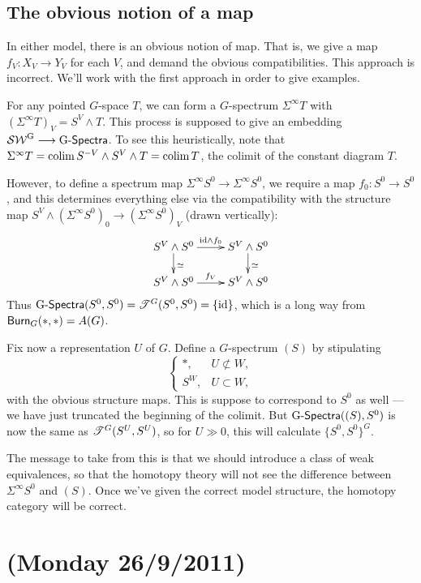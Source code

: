 \documentclass[11pt]{article}
\newcommand{\NewLecture}[3]{\section{#1 {\small(#2/#3/2011)}}}
\begin{document}
\begin{FirstNineLectures}
\subsection*{The obvious notion of a map}
In either model, there is an obvious notion of map. That is, we give a map $f_V:X_V\to Y_V$ for each $V$, and demand the obvious compatibilities. This approach is incorrect. We'll work with the first approach in order to give examples.
\begin{exmp*}
For any pointed $G$-space $T$, we can form a $G$-spectrum $\Sigma^\infty T$ with $(\Sigma^\infty T)_V=S^V\wedge T$. This process is supposed to give an embedding $\operatorname{{\mathcal{SW}^G}}\longrightarrow\operatorname{{G-\mathsf{Spectra}}}$. To see this heuristically, note that $\Sigma^\infty T=\operatorname{colim} S^{-V}\wedge S^V\wedge T=\operatorname{colim} T$, the colimit of the constant diagram $T$. 

However, to define a spectrum map $\Sigma^\infty S^0\to \Sigma^\infty S^0$, we require a map $f_0:S^0\to S^0$, and this determines everything else via the compatibility with the structure map $S^V\wedge(\Sigma^\infty S^0)_0\to(\Sigma^\infty S^0)_V$ (drawn vertically):
\[\xymatrix@R=.6cm{ 
\ar[d]^\simeq S^V\wedge S^0\ar[r]^{\id\wedge f_0}&S^V\wedge S^0\ar[d]^\simeq\\
S^V\wedge S^0\ar[r]^{f_V}&S^V\wedge S^0
}\]
Thus $\operatorname{{G-\mathsf{Spectra}}}(S^0,S^0)=\mathscr{T}^G(S^0,S^0)=\{\textup{id}\}$, which is a long way from $\operatorname{{\mathsf{Burn}}}_G(*,*)=A(G)$.
\end{exmp*}
Fix now a representation $U$ of $G$. Define a $G$-spectrum $(S)$ by stipulating
\[\begin{cases} *,&U\not\subset W,\\ S^W,&U\subset W,\end{cases}\]
with the obvious structure maps. This is suppose to correspond to $S^0$ as well --- we have just truncated the beginning of the colimit. But $\operatorname{{G-\mathsf{Spectra}}}((S),S^0)$ is now the same as $\mathscr{T}^G(S^U,S^U)$, so for $U\gg0$, this will calculate $\{S^0,S^0\}^G$.

The message to take from this is that we should introduce a class of weak equivalences, so that the homotopy theory will not see the difference between $\Sigma^\infty S^0$ and $(S)$. Once we've given the correct model structure, the homotopy category will be correct.
\end{FirstNineLectures}
\NewLecture{}{Monday 26}{9}
\end{document}
